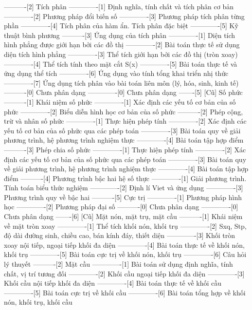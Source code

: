 ----------[2] Tích phân
-------------[1] Định nghĩa, tính chất và tích phân cơ bản
-------------[2] Phương pháp đổi biến số
-------------[3] Phương pháp tích phân từng phần
-------------[4] Tích phân của hàm ẩn. Tích phân đặc biệt
-------------[5] Kỹ thuật bình phương
----------[3] Ứng dụng của tích phân
-------------[1] Diện tích hình phẳng được giới hạn bởi các đồ thị
-------------[2] Bài toán thực tế sử dụng diện tích hình phẳng
-------------[3] Thể tích giới hạn bởi các đồ thị (tròn xoay)
-------------[4] Thể tích tính theo mặt cắt S(x)
-------------[5] Bài toán thực tế và ứng dụng thể tích
-------------[6] Ứng dụng vào tính tổng khai triển nhị thức
-------------[7] Ứng dụng tích phân vào bài toán liên môn (lý, hóa, sinh, kinh tế)
----------[0] Chưa phân dạng
-------------[0] Chưa phân dạng
-------[5] [Cũ] Số phức
----------[1] Khái niệm số phức
-------------[1] Xác định các yếu tố cơ bản của số phức
-------------[2] Biểu diễn hình học cơ bản của số phức
----------[2] Phép cộng, trừ và nhân số phức
-------------[1] Thực hiện phép tính
-------------[2] Xác định các yếu tố cơ bản của số phức qua các phép toán
-------------[3] Bài toán quy về giải phương trình, hệ phương trình nghiệm thực
-------------[4] Bài toán tập hợp điểm
----------[3] Phép chia số phức
-------------[1] Thực hiện phép tính
-------------[2] Xác định các yếu tố cơ bản của số phức qua các phép toán
-------------[3] Bài toán quy về giải phương trình, hệ phương trình nghiệm thực
-------------[4] Bài toán tập hợp điểm
----------[4] Phương trình bậc hai hệ số thực
-------------[1] Giải phương trình. Tính toán biểu thức nghiệm
-------------[2] Định lí Viet và ứng dụng
-------------[3] Phương trình quy về bậc hai
----------[5] Cực trị
-------------[1] Phương pháp hình học
-------------[2] Phương pháp đại số
----------[0] Chưa phân dạng
-------------[0] Chưa phân dạng
-------[6] [Cũ] Mặt nón, mặt trụ, mặt cầu
----------[1] Khái niệm về mặt tròn xoay
-------------[1] Thể tích khối nón, khối trụ
-------------[2] Sxq, Stp, độ dài đường sinh, chiều cao, bán kính đáy, thiết diện
-------------[3] Khối tròn xoay nội tiếp, ngoại tiếp khối đa diện
-------------[4] Bài toán thực tế về khối nón, khối trụ
-------------[5] Bài toán cực trị về khối nón, khối trụ
-------------[6] Câu hỏi lý thuyết
----------[2] Mặt cầu
-------------[1] Bài toán sử dụng định nghĩa, tính chất, vị trí tương đối
-------------[2] Khối cầu ngoại tiếp khối đa diện
-------------[3] Khối cầu nội tiếp khối đa diện
-------------[4] Bài toán thực tế về khối cầu
-------------[5] Bài toán cực trị về khối cầu
-------------[6] Bài toán tổng hợp về khối nón, khối trụ, khối cầu

